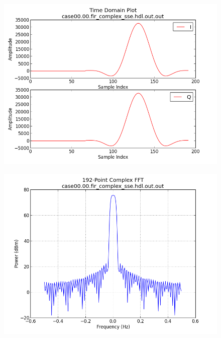 	\begin{figure}[ht]
		\centering
		\begin{minipage}{.5\textwidth}
			\centering\includegraphics[width=1.0\linewidth]{output_time}
			\label{fig:out_time}
		\end{minipage}%
		\begin{minipage}{.5\textwidth}
			\centering\includegraphics[width=1.0\linewidth]{output_freq}
			\label{fig:out_freq}
		\end{minipage}
	\end{figure}

